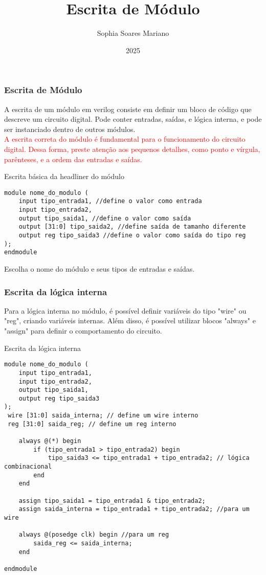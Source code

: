 \documentclass{beamer}
\title{Escrita de Módulo}
\author{Sophia Soares Mariano}
\institute{Poliware}
\date{2025}
\begin{document}
\frame{\titlepage}

\begin{frame}
\frametitle{Escrita de Módulo}
A escrita de um módulo em verilog consiste em definir um bloco de código que descreve um circuito digital. 
Pode conter entradas, saídas, e lógica interna, e pode ser instanciado dentro de outros módulos.
\\
\textcolor{red}{A escrita correta do módulo é fundamental para o funcionamento do circuito digital. Dessa forma, preste atenção
aos pequenos detalhes, como ponto e vírgula, parênteses, e a ordem das entradas e saídas.}
\end{frame}


\begin{frame}[fragile]{Escrita básica da headliner do módulo}
\small
\begin{verbatim}
module nome_do_modulo (
    input tipo_entrada1, //define o valor como entrada
    input tipo_entrada2,
    output tipo_saida1, //define o valor como saída
    output [31:0] tipo_saida2, //define saída de tamanho diferente
    output reg tipo_saida3 //define o valor como saída do tipo reg
);
endmodule
\end{verbatim}
Escolha o nome do módulo e seus tipos de entradas e saídas.
\end{frame}

\begin{frame}
\frametitle{Escrita da lógica interna}
Para a lógica interna no módulo, é possível definir variáveis do tipo "wire" ou "reg", criando variáveis internas.
Além disso, é possível utilizar blocos "always" e "assign" para definir o comportamento do circuito.
\end{frame}

\begin{frame}[fragile]{Escrita da lógica interna}
\scriptsize
\begin{verbatim}
module nome_do_modulo (
    input tipo_entrada1,
    input tipo_entrada2,
    output tipo_saida1, 
    output reg tipo_saida3 
);
 wire [31:0] saida_interna; // define um wire interno
 reg [31:0] saida_reg; // define um reg interno

    always @(*) begin
        if (tipo_entrada1 > tipo_entrada2) begin
            tipo_saida3 <= tipo_entrada1 + tipo_entrada2; // lógica combinacional
        end
    end

    assign tipo_saida1 = tipo_entrada1 & tipo_entrada2; 
    assign saida_interna = tipo_entrada1 + tipo_entrada2; //para um wire

    always @(posedge clk) begin //para um reg
        saida_reg <= saida_interna; 
    end

endmodule
\end{verbatim}
\end{frame}
\end{document}
